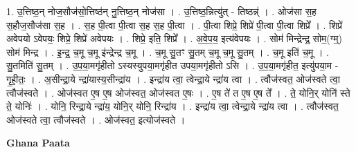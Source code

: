 \documentclass[17pt]{extarticle}
\begin{document}
1. उ॒त्तिष्ठ॒न् नोज॒सौज॑सो॒त्तिष्ठ॑न् नु॒त्तिष्ठ॒न् नोज॑सा । . उ॒त्तिष्ठ॒न्नित्यु॑त् - तिष्ठन्न्॑ । . ओज॑सा स॒ह स॒हौज॒सौज॑सा स॒ह । . स॒ह पी॒त्वा पी॒त्वा स॒ह स॒ह पी॒त्वा । . पी॒त्वा शिप्रे॒ शिप्रे॑ पी॒त्वा पी॒त्वा शिप्रे᳚ । . शिप्रे॑ अवेपयो ऽवेपयः॒ शिप्रे॒ शिप्रे॑ अवेपयः । . शिप्रे॒ इति॒ शिप्रे᳚ । . अ॒वे॒प॒य॒ इत्य॑वेपयः । . सोम॑ मिन्द्रेन्द्र॒ सोम॒(ग्म्॒) सोम॑ मिन्द्र । . इ॒न्द्र॒ च॒मू च॒मू इ॑न्द्रेन्द्र च॒मू । . च॒मू सु॒तꣳ सु॒तम् च॒मू च॒मू सु॒तम् । . च॒मू इति॑ च॒मू । . सु॒तमिति॑ सु॒तम् । . उ॒प॒या॒मगृ॑हीतो ऽस्यस्युपया॒मगृ॑हीत उपया॒मगृ॑हीतो ऽसि । . उ॒प॒या॒मगृ॑हीत॒ इत्यु॑पया॒म - गृ॒ही॒तः॒ । . अ॒सीन्द्रा॒ये न्द्रा॑यास्य॒सीन्द्रा॑य । . इन्द्रा॑य त्वा॒ त्वेन्द्रा॒ये न्द्रा॑य त्वा । . त्वौज॑स्वत॒ ओज॑स्वते त्वा॒ त्वौज॑स्वते । . ओज॑स्वत ए॒ष ए॒ष ओज॑स्वत॒ ओज॑स्वत ए॒षः । . ए॒ष ते॑ त ए॒ष ए॒ष ते᳚ । . ते॒ योनि॒र् योनि॑ स्ते ते॒ योनिः॑ । . योनि॒ रिन्द्रा॒ये न्द्रा॑य॒ योनि॒र् योनि॒ रिन्द्रा॑य । . इन्द्रा॑य त्वा॒ त्वेन्द्रा॒ये न्द्रा॑य त्वा । . त्वौज॑स्वत॒ ओज॑स्वते त्वा॒ त्वौज॑स्वते । . ओज॑स्वत॒ इत्योज॑स्वते । \newline

\textbf{Ghana Paata } \newline
\end{document}
